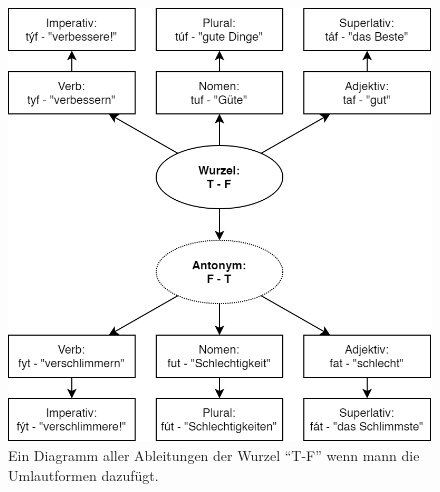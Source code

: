 \documentclass{article}
\begin{document}
\begin{figure}
	\centering
	\includegraphics[scale=0.33]{root_derivations_2.png}
	\caption{Ein Diagramm aller Ableitungen der Wurzel ``T-F'' wenn mann die Umlautformen dazufügt.}
	\label{root_derivations_2}
\end{figure}
\end{document}
